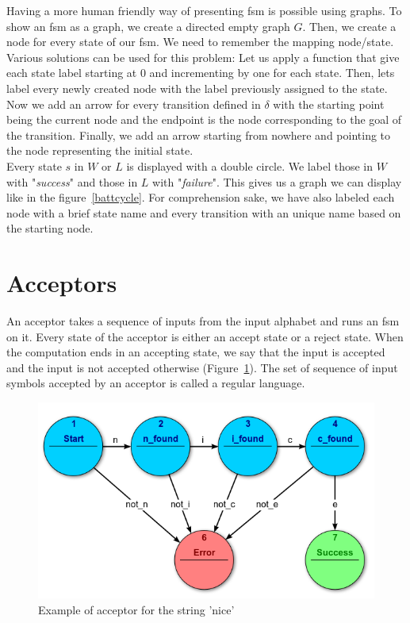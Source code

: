 \documentclass[12pt]{article}
\theoremstyle{definition}
\theoremstyle{definition}
\theoremstyle{remark}
\begin{document}
Having a more human friendly way of presenting \gls{fsm} is possible using graphs. To show an \gls{fsm} as a graph, we create a directed empty graph $G$. Then, we create a node for every state of our \gls{fsm}. We need to remember the mapping node/state. Various solutions can be used for this problem: Let us apply a function that give each state label starting at 0 and incrementing by one for each state. Then, lets label every newly created node with the label previously assigned to the state.\\

Now we add an arrow for every transition defined in $\delta$ with the starting point being the current node and the endpoint is the node corresponding to the goal of the transition. Finally, we add an arrow starting from nowhere and pointing to the node representing the initial state.\\

Every state $s$ in $W$ or $L$ is displayed with a double circle. We label those in $W$ with "\textit{success}" and those in $L$ with "\textit{failure}". This gives us a graph we can display like in the figure~\ref{battcycle}. For comprehension sake, we have also labeled each node with a brief state name and every transition with an unique name based on the starting node.



\section{Acceptors}


An acceptor takes a sequence of inputs from the input alphabet and runs an \gls{fsm} on it. Every state of the acceptor is either an accept state or a reject state. When the computation ends in an accepting state, we say that the input is accepted and the input is not accepted otherwise (Figure~\ref{acceptor}). The set of sequence of input symbols accepted by an acceptor is called a regular language.\\

\begin{figure}
    \centering
    \includegraphics[scale=0.8]{acceptor.png}
    \caption{Example of acceptor for the string 'nice'~\cite{FSM:2017}}
    \label{acceptor}
\end{figure}
\end{document}
